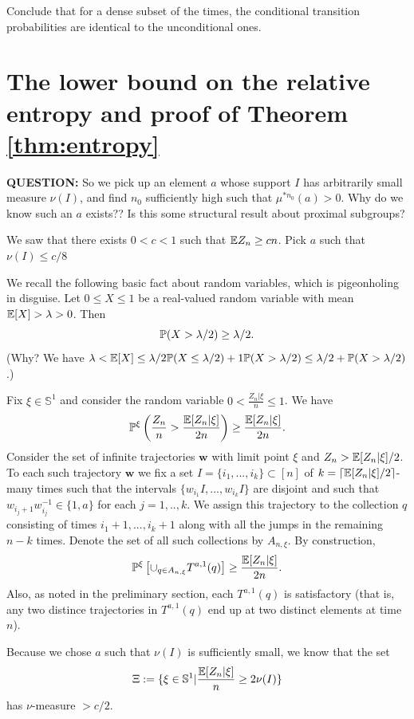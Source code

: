 Conclude that for a dense subset of the times, the conditional transition probabilities are identical to the unconditional ones.

\section{The lower bound on the relative entropy and proof of Theorem \ref{thm:entropy}}
\textbf{QUESTION:} So we pick up an element $a$ whose support $I$ has arbitrarily small measure $\nu(I)$, and find $n_0$ sufficiently high such that $\mu^{* n_0}(a)>0$.
Why do we know such an $a$ exists??
Is this some structural result about proximal subgroups?

We saw that there exists $0<c<1$ such that $\E Z_n \geq c n$.
Pick $a$ such that $\nu(I) \leq c/8$

We recall the following basic fact about random variables, which is pigeonholing in disguise.
Let $0 \leq X \leq 1$ be a real-valued random variable with mean $\E[X] > \lambda > 0$.
Then
$$\P( X > \lambda/2) \geq \lambda/2.$$
(Why? We have $\lambda < \E[X] \leq \lambda/2 \P( X \leq \lambda/2) + 1 \P( X > \lambda/2) \leq \lambda/2 + \P( X > \lambda/2)$.)

Fix $\xi \in \mathbb{S}^1$ and consider the random variable $0 < \frac{Z_n|\xi}{n} \leq 1$.
We have
$$\P^\xi\left( \frac{Z_n}{n} > \frac{\E[Z_n|\xi]}{2n}\right) \geq \frac{\E[Z_n|\xi]}{2n}.$$
Consider the set of infinite trajectories $\boldsymbol{w}$ with limit point $\xi$ and $Z_n > \E[Z_n|\xi]/2$.
To each such trajectory $\boldsymbol{w}$ we fix a set $I = \{i_1,...,i_k\} \subset [n]$ of $k = \lceil \E[Z_n|\xi]/2\rceil$-many times such that the intervals 
$\{w_{i_1}I,...,w_{i_k}I\}$ are disjoint
and such that $w_{i_j+1}w_{i_j}^{-1} \in \{1,a\}$ for each $j=1,..,k$.
We assign this trajectory to the collection $q$ consisting of times $i_1+1,...,i_k+1$ along with all the jumps in the remaining $n-k$ times.
Denote the set of all such collections by $A_{n,\xi}$.
By construction,
$$\P^\xi\left[ \cup_{q \in A_{n,\xi}} T^{a,1}(q)\right] \geq \frac{\E[Z_n|\xi]}{2n}.$$
Also, as noted in the preliminary section, each $T^{a,1}(q)$ is satisfactory (that is, any two distince trajectories in $T^{a,1}(q)$ end up at two distinct elements at time $n$).

Because we chose $a$ such that $\nu(I)$ is sufficiently small, we know that the set $$\Xi := \{\xi \in \mathbb{S}^1| \dfrac{\E[Z_n|\xi]}{n} \geq 2 \nu(I)\}$$
has $\nu$-measure $>c/2$.

